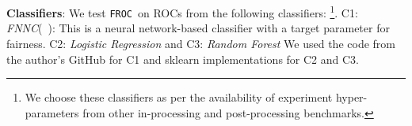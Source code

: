 \documentclass{article}
\newcommand{\ouralgo}{\texttt{FROC}}
\begin{document}
\noindent \textbf{Classifiers}: We test \ouralgo\ on ROCs from the following classifiers:
\footnote{We choose these classifiers as per the availability of experiment hyper-parameters from other in-processing and post-processing benchmarks.}.
    C1: \emph{FNNC}(~\cite{padala21}): This is a neural network-based classifier with a target parameter for fairness.
    C2: \emph{Logistic Regression} and 
    C3: \emph{Random Forest}
We used the code from the author's GitHub for C1 and sklearn implementations for C2 and C3.


% 
%     
%     
%     

% 
% 
% 
\end{document}
